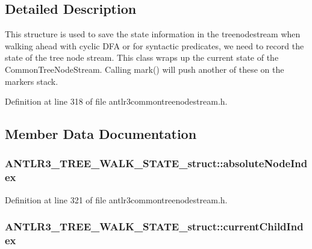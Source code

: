 \subsection{Detailed Description}
This structure is used to save the state information in the treenodestream when walking ahead with cyclic D\-F\-A or for syntactic predicates, we need to record the state of the tree node stream. This class wraps up the current state of the Common\-Tree\-Node\-Stream. Calling mark() will push another of these on the markers stack. 

Definition at line 318 of file antlr3commontreenodestream.\-h.



\subsection{Member Data Documentation}
\hypertarget{struct_a_n_t_l_r3___t_r_e_e___w_a_l_k___s_t_a_t_e__struct_a7af3a25031e5a20b4434d68990f70710}{
\subsubsection[{absolute\-Node\-Index}]{ A\-N\-T\-L\-R3\-\_\-\-T\-R\-E\-E\-\_\-\-W\-A\-L\-K\-\_\-\-S\-T\-A\-T\-E\-\_\-struct\-::absolute\-Node\-Index}}\label{struct_a_n_t_l_r3___t_r_e_e___w_a_l_k___s_t_a_t_e__struct_a7af3a25031e5a20b4434d68990f70710}


Definition at line 321 of file antlr3commontreenodestream.\-h.

\hypertarget{struct_a_n_t_l_r3___t_r_e_e___w_a_l_k___s_t_a_t_e__struct_a81cb853de85e8e2eba4bc664d6fe69ac}{
\subsubsection[{current\-Child\-Index}]{ A\-N\-T\-L\-R3\-\_\-\-T\-R\-E\-E\-\_\-\-W\-A\-L\-K\-\_\-\-S\-T\-A\-T\-E\-\_\-struct\-::current\-Child\-Index}}\label{struct_a_n_t_l_r3___t_r_e_e___w_a_l_k___s_t_a_t_e__struct_a81cb853de85e8e2eba4bc664d6fe69ac}


